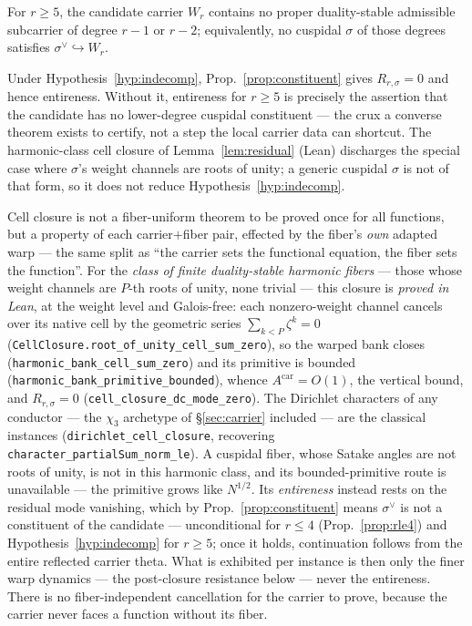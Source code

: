\documentclass[11pt]{article}
\theoremstyle{definition}
\begin{document}
\begin{hypothesis}\label{hyp:indecomp}
For $r\ge5$, the candidate carrier $W_r$ contains no proper duality-stable admissible subcarrier of degree
$r-1$ or $r-2$; equivalently, no cuspidal $\sigma$ of those degrees satisfies
$\sigma^{\vee}\hookrightarrow W_r$.
\end{hypothesis}

\noindent Under Hypothesis~\ref{hyp:indecomp}, Prop.~\ref{prop:constituent} gives $R_{r,\sigma}=0$ and hence
entireness. Without it, entireness for $r\ge5$ is precisely the assertion that the candidate has no
lower-degree cuspidal constituent --- the crux a converse theorem exists to certify, not a step the local
carrier data can shortcut. The harmonic-class cell closure of Lemma~\ref{lem:residual} (Lean) discharges the
special case where $\sigma$'s weight channels are roots of unity; a generic cuspidal $\sigma$ is not of that
form, so it does not reduce Hypothesis~\ref{hyp:indecomp}.

\noindent Cell closure is not a fiber-uniform theorem to be proved once for all functions, but a property
of each carrier$+$fiber pair, effected by the fiber's \emph{own} adapted warp --- the same split as ``the
carrier sets the functional equation, the fiber sets the function''. For the \emph{class of finite
duality-stable harmonic fibers} --- those whose weight channels are $P$-th roots of unity, none trivial ---
this closure is \emph{proved in Lean}, at the weight level and Galois-free: each nonzero-weight channel
cancels over its native cell by the geometric series $\sum_{k<P}\zeta^k=0$
(\texttt{CellClosure.root\_of\_unity\_cell\_sum\_zero}), so the warped bank closes
(\texttt{harmonic\_bank\_cell\_sum\_zero}) and its primitive is bounded
(\texttt{harmonic\_bank\_primitive\_bounded}), whence $A^{\mathrm{car}}=O(1)$, the vertical bound, and
$R_{r,\sigma}=0$ (\texttt{cell\_closure\_dc\_mode\_zero}). The Dirichlet characters of any conductor ---
the $\chi_3$ archetype of \S\ref{sec:carrier} included --- are the classical instances
(\texttt{dirichlet\_cell\_closure}, recovering \texttt{character\_partialSum\_norm\_le}). A cuspidal fiber,
whose Satake angles are not roots of unity, is not in this harmonic class, and its bounded-primitive route is
unavailable --- the primitive grows like $N^{1/2}$. Its \emph{entireness} instead rests on the residual mode
vanishing, which by Prop.~\ref{prop:constituent} means $\sigma^{\vee}$ is not a constituent of the candidate
--- unconditional for $r\le4$ (Prop.~\ref{prop:rle4}) and Hypothesis~\ref{hyp:indecomp} for $r\ge5$; once it
holds, continuation follows from the entire reflected carrier theta. What is exhibited per instance is then
only the finer warp dynamics --- the post-closure resistance below --- never the entireness. There is no
fiber-independent cancellation for the carrier to prove, because the carrier never faces a function without
its fiber.
\end{document}
